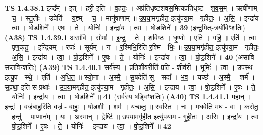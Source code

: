 \documentclass[17pt]{extarticle}
\begin{document}
                                \textbf{ TS 1.4.38.1} \newline
                  इन्द्र᳚म् । इत् । हरी॒ इति॑ । व॒ह॒तः॒ । अप्र॑तिधृष्टशवस॒मित्यप्र॑तिधृष्ट - श॒व॒स॒म् । ऋषी॑णाम् । च॒ । स्तु॒तीः । उपेति॑ । य॒ज्ञ्म् । च॒ । मानु॑षाणाम् ॥ उ॒प॒या॒मगृ॑हीत॒ इत्यु॑पया॒म - गृ॒ही॒तः॒ । अ॒सि॒ । इन्द्रा॑य । त्वा॒ । षो॒ड॒शिने᳚ । ए॒षः । ते॒ । योनिः॑ । इन्द्रा॑य । त्वा॒ । षो॒ड॒शिने᳚ ॥ \textbf{  39 } \newline
                  \newline
                      (इन्द्र॒मित्-त्रयो॑विꣳशतिः)  \textbf{(A38)} \newline \newline
                                \textbf{ TS 1.4.39.1} \newline
                  असा॑वि । सोमः॑ । इ॒न्द्र॒ । ते॒ । शवि॑ष्ठ । धृ॒ष्णो॒ । एति॑ । ग॒हि॒ ॥ एति॑ । त्वा॒ । पृ॒ण॒क्‌तु॒ । इ॒न्द्रि॒यम् । रजः॑ । सूर्य᳚म् । न । र॒श्मिभि॒रिति॑ र॒श्मि - भिः॒ ॥ उ॒प॒या॒मगृ॑हीत॒ इत्यु॑पया॒म - गृ॒ही॒तः॒ । अ॒सि॒ । इन्द्रा॑य । त्वा॒ । षो॒ड॒शिने᳚ । ए॒षः । ते॒ । योनिः॑ । इन्द्रा॑य । त्वा॒ । षो॒ड॒शिने᳚ ॥ \textbf{  40 } \newline
                  \newline
                      (असा॑वि-स॒प्तविꣳ॑शतिः)  \textbf{(A39)} \newline \newline
                                \textbf{ TS 1.4.40.1} \newline
                  सर्व॑स्य । प्र॒ति॒शीव॒रीति॑ प्रति - शीव॑री । भूमिः॑ । त्वा॒ । उ॒पस्थ॒ इत्यु॒प - स्थे॒ । एति॑ । अ॒धि॒त॒ ॥ स्यो॒ना । अ॒स्मै॒ । सु॒षदेति॑ सु - सदा᳚ । भ॒व॒ । यच्छ॑ । अ॒स्मै॒ । शर्म॑ । स॒प्रथा॒ इति॑ स-प्रथाः᳚ ॥ उ॒प॒या॒मगृ॑हीत॒ इत्यु॑पया॒म - गृ॒ही॒तः॒ । अ॒सि॒ । इन्द्रा॑य । त्वा॒ । षो॒ड॒शिने᳚ । ए॒षः । ते॒ । योनिः॑ । इन्द्रा॑य । त्वा॒ । षो॒ड॒शिने᳚ ॥ \textbf{  41} \newline
                  \newline
                      (सर्व॑स्य॒ षड्विꣳ॑शतिः)  \textbf{(A40)} \newline \newline
                                \textbf{ TS 1.4.41.1} \newline
                  म॒हान् । इन्द्रः॑ । वज्र॑बाहु॒रिति॒ वज्र॑ - बा॒हुः॒ । षो॒ड॒शी । शर्म॑ । य॒च्छ॒तु॒ ॥ स्व॒स्ति । नः॒ । म॒घवेति॑ म॒घ - वा॒ । क॒रो॒तु॒ । हन्तु॑ । पा॒प्मान᳚म् । यः । अ॒स्मान् । द्वेष्टि॑ ॥ उ॒प॒या॒मगृ॑हीत॒ इत्यु॑पया॒म - गृ॒ही॒तः॒ । अ॒सि॒ । इन्द्रा॑य । त्वा॒ । षो॒ड॒शिने᳚ । ए॒षः । ते॒ । योनिः॑ । इन्द्रा॑य । त्वा॒ । षो॒ड॒शिने᳚ ॥ \textbf{  42} \newline
\end{document}
